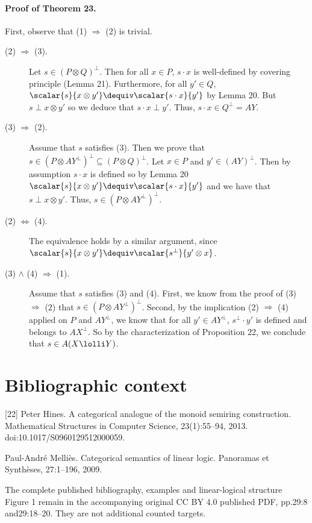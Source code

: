 \paragraph{Proof of Theorem 23.} First, observe that (1) $\Rightarrow$ (2) is trivial.
\begin{description}
\item[(2) $\Rightarrow$ (3).] Let $s\in(P\otimes Q)^\perp$. Then for all $x\in P$, $s\cdot x$ is well-defined by covering principle (Lemma 21). Furthermore, for all $y'\in Q$, $\scalar{s}{x\otimes y'}\dequiv\scalar{s\cdot x}{y'}$ by Lemma 20. But $s\perp x\otimes y'$ so we deduce that $s\cdot x\perp y'$. Thus, $s\cdot x\in Q^\perp=AY$.
\item[(3) $\Rightarrow$ (2).] Assume that $s$ satisfies (3). Then we prove that $s\in(P\otimes AY^\perp)^\perp\subseteq(P\otimes Q)^\perp$. Let $x\in P$ and $y'\in(AY)^\perp$. Then by assumption $s\cdot x$ is defined so by Lemma 20 $\scalar{s}{x\otimes y'}\dequiv\scalar{s\cdot x}{y'}$ and we have that $s\perp x\otimes y'$. Thus, $s\in(P\otimes AY^\perp)^\perp$.
\item[(2) $\Leftrightarrow$ (4).] The equivalence holds by a similar argument, since $\scalar{s}{x\otimes y'}\dequiv\scalar{s^\perp}{y'\otimes x}$.
\item[(3) $\wedge$ (4) $\Rightarrow$ (1).] Assume that $s$ satisfies (3) and (4). First, we know from the proof of (3) $\Rightarrow$ (2) that $s\in(P\otimes AY^\perp)^\perp$. Second, by the implication (2) $\Rightarrow$ (4) applied on $P$ and $AY^\perp$, we know that for all $y'\in AY^\perp$, $s^\perp\cdot y'$ is defined and belongs to $AX^\perp$. So by the characterization of Proposition 22, we conclude that $s\in A(X\lolli Y)$.
\end{description}
\section*{Bibliographic context}
[22] Peter Hines. A categorical analogue of the monoid semiring construction. Mathematical Structures in Computer Science, 23(1):55--94, 2013. doi:10.1017/S0960129512000059.\par
[38] Paul-Andr\'e Melli\`es. Categorical semantics of linear logic. Panoramas et Synth\`eses, 27:1--196, 2009.\par
The complete published bibliography, examples and linear-logical structure Figure 1 remain in the accompanying original CC BY 4.0 published PDF, pp.29:8 and29:18--20. They are not additional counted targets.
